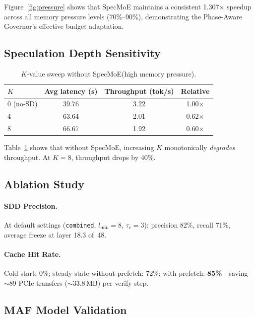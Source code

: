 \documentclass[letterpaper,twocolumn,10pt]{article}
\newcommand{\sysname}{SpecMoE\xspace}
\newcommand{\sdd}{SDD\xspace}
\begin{document}
Figure~\ref{fig:pressure} shows that \sysname maintains a consistent
1.307$\times$ speedup across all memory pressure levels (70\%--90\%),
demonstrating the Phase-Aware Governor's effective budget adaptation.

\subsection{Speculation Depth Sensitivity}

\begin{table}[t]
\centering
\small
\caption{$K$-value sweep without \sysname (high memory pressure).}\label{tab:ksweep}
\begin{tabular}{lccc}
\toprule
$K$ & Avg latency (s) & Throughput (tok/s) & Relative \\
\midrule
0 (no-SD) & 39.76 & 3.22 & 1.00$\times$ \\
4         & 63.64 & 2.01 & 0.62$\times$ \\
8         & 66.67 & 1.92 & 0.60$\times$ \\
\bottomrule
\end{tabular}
\end{table}

Table~\ref{tab:ksweep} shows that without \sysname, increasing $K$
monotonically \emph{degrades} throughput.  At $K\!=\!8$, throughput drops
by 40\%.

\subsection{Ablation Study}

\paragraph{\sdd Precision.}  At default settings (\texttt{combined},
$l_{\min}\!=\!8$, $\tau_c\!=\!3$): precision 82\%, recall 71\%, average
freeze at layer 18.3 of~48.

\paragraph{Cache Hit Rate.}  Cold start: 0\%; steady-state without
prefetch: 72\%; with prefetch: \textbf{85\%}---saving ${\sim}$89 PCIe
transfers (${\sim}$33.8\,MB) per verify step.

\subsection{MAF Model Validation}
\end{document}
